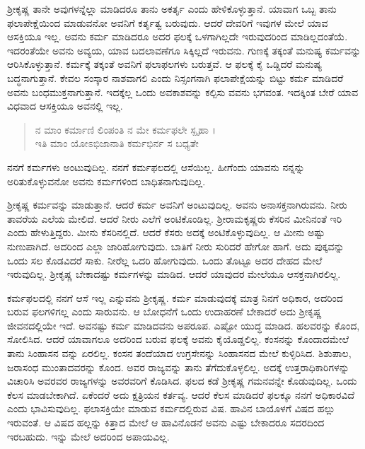 ಶ್ರೀಕೃಷ್ಣ ತಾನೇ ಅವುಗಳನ್ನೆಲ್ಲಾ ಮಾಡಿದರೂ ತಾನು ಅಕರ್ತೃ ಎಂದು ಹೇಳಿಕೊಳ್ಳುತ್ತಾನೆ. ಯಾವಾಗ ಒಬ್ಬ ತಾನು ಫಲಾಪೇಕ್ಷೆಯಿಂದ ಮಾಡುವನೋ ಅವನಿಗೆ ಕರ್ತೃತ್ವ ಬರುವುದು. ಆದರೆ ದೇವರಿಗೆ ಇವುಗಳ ಮೇಲೆ ಯಾವ ಆಸಕ್ತಿಯೂ ಇಲ್ಲ. ಅವನು ಕರ್ಮ ಮಾಡಿದರೂ ಅದರ ಫಲಕ್ಕೆ ಒಳಗಾಗಿಲ್ಲದೇ ಇರುವುದರಿಂದ ಮಾಡಿಲ್ಲದಂತೆಯೆ. ಇದರಂತೆಯೇ ಅವನು ಅವ್ಯಯ, ಯಾವ ಬದಲಾವಣೆಗೂ ಸಿಕ್ಕಿಲ್ಲದೆ ಇರುವನು. ಗುಣಕ್ಕೆ ತಕ್ಕಂತೆ ಮನುಷ್ಯ ಕರ್ಮವನ್ನು ಆರಿಸಿಕೊಳ್ಳುತ್ತಾನೆ. ಕರ್ಮಕ್ಕೆ ತಕ್ಕಂತೆ ಅವನಿಗೆ ಫಲಾಫಲಗಳು ಬರುತ್ತವೆ. ಆ ಫಲಕ್ಕೆ ಕೈ ಒಡ್ಡಿದರೆ ಮನುಷ್ಯ ಬದ್ಧನಾಗುತ್ತಾನೆ. ಕೇವಲ ಸಂಸ್ಕಾರ ನಾಶವಾಗಲಿ ಎಂದು ನಿಸ್ಸಂಗನಾಗಿ ಫಲಾಪೇಕ್ಷೆಯನ್ನು ಬಿಟ್ಟು ಕರ್ಮ ಮಾಡಿದರೆ ಅವನು ಬಂಧಮುಕ್ತನಾಗುತ್ತಾನೆ. ಇದಕ್ಕೆಲ್ಲ ಒಂದು ಅವಕಾಶವನ್ನು ಕಲ್ಪಿಸು ವವನು ಭಗವಂತ. ಇದಕ್ಕಿಂತ ಬೇರೆ ಯಾವ ವಿಧವಾದ ಆಸಕ್ತಿಯೂ ಅವನಲ್ಲಿ ಇಲ್ಲ.

\begin{verse}
ನ ಮಾಂ ಕರ್ಮಾಣಿ ಲಿಂಪಂತಿ ನ ಮೇ ಕರ್ಮಫಲೇ ಸ್ಪೃಹಾ ।\\ಇತಿ ಮಾಂ ಯೋಽಭಿಜಾನಾತಿ ಕರ್ಮಭಿರ್ನ ಸ ಬಧ್ಯತೇ 
\end{verse}

{\small ನನಗೆ ಕರ್ಮಗಳು ಅಂಟುವುದಿಲ್ಲ. ನನಗೆ ಕರ್ಮಫಲದಲ್ಲಿ ಆಸೆಯಿಲ್ಲ. ಹೀಗೆಂದು ಯಾವನು ನನ್ನನ್ನು ಅರಿತುಕೊಳ್ಳುವನೋ ಅವನು ಕರ್ಮಗಳಿಂದ ಬಾಧಿತನಾಗುವುದಿಲ್ಲ.}

ಶ್ರೀಕೃಷ್ಣ ಕರ್ಮವನ್ನು ಮಾಡುತ್ತಾನೆ. ಆದರೆ ಕರ್ಮ ಅವನಿಗೆ ಅಂಟುವುದಿಲ್ಲ. ಅವನು ಅನಾಸಕ್ತನಾಗಿರುವನು. ನೀರು ತಾವರೆಯ ಎಲೆಯ ಮೇಲಿದೆ. ಆದರೆ ನೀರು ಎಲೆಗೆ ಅಂಟಿಕೊಂಡಿಲ್ಲ. ಶ್ರೀರಾಮಕೃಷ್ಣರು ಕೆಸರಿನ ಮೀನಿನಂತೆ ಇರಿ ಎಂದು ಹೇಳುತ್ತಿದ್ದರು. ಮೀನು ಕೆಸರಿನಲ್ಲಿದೆ. ಆದರೆ ಕೆಸರು ಅದಕ್ಕೆ ಅಂಟಿಕೊಳ್ಳುವುದಿಲ್ಲ. ಆ ಮೀನು ಅಷ್ಟು ನುಣುಪಾಗಿದೆ. ಅದರಿಂದ ಎಲ್ಲಾ ಜಾರಿಹೋಗುವುದು. ಬಾತಿಗೆ ನೀರು ಸುರಿದರೆ ಹೇಗೋ ಹಾಗೆ. ಅದು ಪುಕ್ಕವನ್ನು ಒಂದು ಸಲ ಕೊಡವಿದರೆ ಸಾಕು. ನೀರೆಲ್ಲ ಒದರಿ ಹೋಗುವುದು. ಒಂದು ತೊಟ್ಟೂ ಅದರ ದೇಹದ ಮೇಲೆ ಇರುವುದಿಲ್ಲ. ಶ್ರೀಕೃಷ್ಣ ಬೇಕಾದಷ್ಟು ಕರ್ಮಗಳನ್ನು ಮಾಡಿದ. ಆದರೆ ಯಾವುದರ ಮೇಲೆಯೂ ಆಸಕ್ತನಾಗಿರಲಿಲ್ಲ.

ಕರ್ಮಫಲದಲ್ಲಿ ನನಗೆ ಆಸೆ ಇಲ್ಲ ಎನ್ನುವನು ಶ್ರೀಕೃಷ್ಣ. ಕರ್ಮ ಮಾಡುವುದಕ್ಕೆ ಮಾತ್ರ ನಿನಗೆ ಅಧಿಕಾರ, ಅದರಿಂದ ಬರುವ ಫಲಗಳಿಗಲ್ಲ ಎಂದು ಸಾರುವನು. ಆ ಬೋಧನೆಗೆ ಒಂದು ಉದಾಹರಣೆ ಬೇಕಾದರೆ ಅದು ಶ್ರೀಕೃಷ್ಣ ಜೀವನದಲ್ಲಿಯೇ ಇದೆ. ಅವನಷ್ಟು ಕರ್ಮ ಮಾಡಿದವನು ಅಪರೂಪ. ಎಷ್ಟೋ ಯುದ್ಧ ಮಾಡಿದ. ಹಲವರನ್ನು ಕೊಂದ, ಸೋಲಿಸಿದ. ಆದರೆ ಯಾವಾಗಲೂ ಅದರಿಂದ ಬರುವ ಫಲಕ್ಕೆ ಅವನು ಕೈಯೊಡ್ಡಲಿಲ್ಲ. ಕಂಸನನ್ನು ಕೊಂದಾದಮೇಲೆ ತಾನು ಸಿಂಹಾಸನ ವನ್ನು ಏರಲಿಲ್ಲ. ಕಂಸನ ತಂದೆಯಾದ ಉಗ್ರಸೇನನ್ನು ಸಿಂಹಾಸನದ ಮೇಲೆ ಕುಳ್ಳಿರಿಸಿದ. ಶಿಶುಪಾಲ, ಜರಾಸಂಧ ಮುಂತಾದವರನ್ನು ಕೊಂದ. ಅವರ ರಾಜ್ಯವನ್ನು ತಾನು ತೆಗೆದುಕೊಳ್ಳಲಿಲ್ಲ. ಅದಕ್ಕೆ ಉತ್ತರಾಧಿಕಾರಿಗಳನ್ನು ವಿಚಾರಿಸಿ ಅವರವರ ರಾಜ್ಯಗಳನ್ನು ಅವರವರಿಗೆ ಕೊಡಿಸಿದ. ಫಲದ ಕಡೆ ಶ್ರೀಕೃಷ್ಣ ಗಮನವನ್ನೇ ಕೊಡುವುದಿಲ್ಲ. ಒಂದು ಕೆಲಸ ಮಾಡಬೇಕಾಗಿದೆ. ಏಕೆಂದರೆ ಅದು ಕ್ಷತ್ರಿಯನ ಕರ್ತವ್ಯ. ಆದರೆ ಕೆಲಸ ಮಾಡಿದರೆ ಫಲಕ್ಕೂ ನನಗೆ ಅಧಿಕಾರವಿದೆ ಎಂದು ಭಾವಿಸುವುದಿಲ್ಲ. ಫಲಾಸಕ್ತಿಯೇ ಮಾಡುವ ಕರ್ಮದಲ್ಲಿರುವ ವಿಷ. ಹಾವಿನ ಬಾಯೊಳಗೆ ವಿಷದ ಹಲ್ಲು ಇರುವಂತೆ. ಆ ವಿಷದ ಹಲ್ಲನ್ನು ಕಿತ್ತಾದ ಮೇಲೆ ಆ ಹಾವಿನೊಡನೆ ಅವನು ಎಷ್ಟು ಬೇಕಾದರೂ ಸದರದಿಂದ ಇರಬಹುದು. ಇನ್ನು ಮೇಲೆ ಅದರಿಂದ ಅಪಾಯವಿಲ್ಲ.

